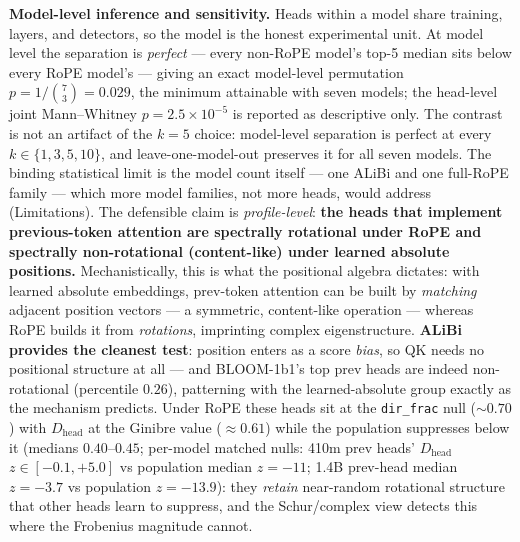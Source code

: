 \documentclass[11pt]{article}
\newcommand{\dirfrac}{\texttt{dir\_frac}\xspace}
\newcommand{\Dhead}{\ensuremath{D_{\text{head}}}\xspace}
\newcommand{\Rope}{RoPE\xspace}
\begin{document}
\textbf{Model-level inference and sensitivity.} Heads within a model share training, layers, and detectors, so the
model is the honest experimental unit. At model level the separation is \emph{perfect} --- every non-\Rope model's
top-5 median sits below every \Rope model's --- giving an exact model-level permutation $p{=}1/\binom{7}{3}{=}0.029$,
the minimum attainable with seven models; the head-level joint Mann--Whitney $p{=}2.5{\times}10^{-5}$ is reported as
descriptive only. The contrast is not an artifact of the $k{=}5$ choice: model-level separation is perfect at every
$k\in\{1,3,5,10\}$, and leave-one-model-out preserves it for all seven models. The binding statistical limit is the
model count itself --- one ALiBi and one full-\Rope family --- which more model families, not more heads, would
address (Limitations). The defensible claim is \emph{profile-level}: \textbf{the heads that implement previous-token
attention are spectrally rotational under \Rope and spectrally non-rotational (content-like) under learned absolute
positions.} Mechanistically, this is what the positional algebra dictates: with learned absolute embeddings,
prev-token attention can be built by \emph{matching} adjacent position vectors --- a symmetric, content-like
operation --- whereas \Rope builds it from \emph{rotations}, imprinting complex eigenstructure. \textbf{ALiBi
provides the cleanest test}: position enters as a score \emph{bias}, so QK needs no positional structure at all ---
and BLOOM-1b1's top prev heads are indeed non-rotational (percentile $0.26$), patterning with the learned-absolute
group exactly as the mechanism predicts. Under \Rope these
heads sit at the \dirfrac null (${\sim}0.70$) with \Dhead at the Ginibre value (${\approx}0.61$) while the
population suppresses below it (medians $0.40$--$0.45$; per-model matched nulls: 410m prev heads' \Dhead
$z\in[-0.1,+5.0]$ vs population median $z{=}{-}11$; 1.4B prev-head median $z{=}{-}3.7$ vs population
$z{=}{-}13.9$): they \emph{retain} near-random rotational structure that other heads learn to suppress, and the
Schur/complex view detects this where the Frobenius magnitude cannot.
\end{document}
